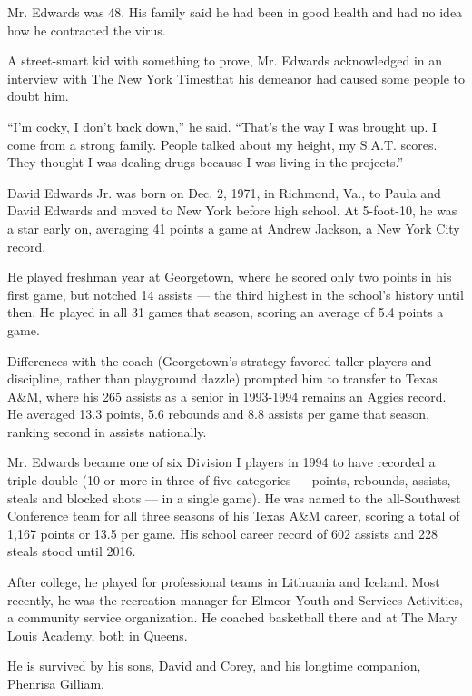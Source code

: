 Mr. Edwards was 48. His family said he had been in good health and had
no idea how he contracted the virus.

A street-smart kid with something to prove, Mr. Edwards acknowledged in
an interview with
\href{https://www.nytimes.com/1993/12/22/sports/college-basketball-don-t-tell-david-edwards-he-can-t.html}{The
New York Times}that his demeanor had caused some people to doubt him.

``I'm cocky, I don't back down,'' he said. ``That's the way I was
brought up. I come from a strong family. People talked about my height,
my S.A.T. scores. They thought I was dealing drugs because I was living
in the projects.''

David Edwards Jr. was born on Dec. 2, 1971, in Richmond, Va., to Paula
and David Edwards and moved to New York before high school. At
5-foot-10, he was a star early on, averaging 41 points a game at Andrew
Jackson, a New York City record.

He played freshman year at Georgetown, where he scored only two points
in his first game, but notched 14 assists --- the third highest in the
school's history until then. He played in all 31 games that season,
scoring an average of 5.4 points a game.

Differences with the coach (Georgetown's strategy favored taller players
and discipline, rather than playground dazzle) prompted him to transfer
to Texas A\&M, where his 265 assists as a senior in 1993-1994 remains an
Aggies record. He averaged 13.3 points, 5.6 rebounds and 8.8 assists per
game that season, ranking second in assists nationally.

Mr. Edwards became one of six Division I players in 1994 to have
recorded a triple-double (10 or more in three of five categories ---
points, rebounds, assists, steals and blocked shots --- in a single
game). He was named to the all-Southwest Conference team for all three
seasons of his Texas A\&M career, scoring a total of 1,167 points or
13.5 per game. His school career record of 602 assists and 228 steals
stood until 2016.

After college, he played for professional teams in Lithuania and
Iceland. Most recently, he was the recreation manager for Elmcor Youth
and Services Activities, a community service organization. He coached
basketball there and at The Mary Louis Academy, both in Queens.

He is survived by his sons, David and Corey, and his longtime companion,
Phenrisa Gilliam.

